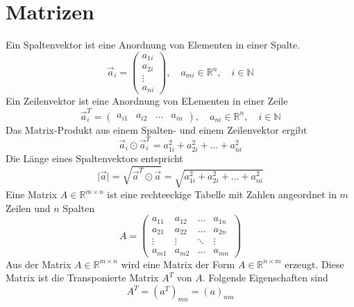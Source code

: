 \section{Matrizen}
Ein Spaltenvektor ist eine Anordnung von Elementen in einer Spalte.
\begin{equation}
\boxed{\overrightarrow{a}_i=\begin{pmatrix}a_{1i}\\a_{2i}\\\vdots\\a_{ni}\end{pmatrix},\quad a_{mi}\in \mathbb{R}^n, \quad i\in \mathbb{N}}
\end{equation}
Ein Zeilenvektor ist eine Anordnung von ELementen in einer Zeile
\begin{equation}
\boxed{\overrightarrow{a}_i^T=\begin{pmatrix}a_{i1}&a_{i2}&\dotso&a_{in}\end{pmatrix},\quad a_{ni}\in \mathbb{R}^n,\quad i\in\mathbb{N}}
\end{equation}
Das Matrix-Produkt aus einem Spalten- und einem Zeilenvektor ergibt 
\begin{equation}
\boxed{\overrightarrow{a}_i\odot \overrightarrow{a}_i^T=a_{1i}^2+a_{2i}^2+\dotso+a_{ni}^2}
\end{equation}
Die Länge eines Spaltenvektors entspricht
\begin{equation}
\boxed{\Big\vert\overrightarrow{a}\Big\vert=\sqrt{\overrightarrow{a}^T\odot \overrightarrow{a}}=\sqrt{a_{1i}^2+a_{2i}^2+\dotso+a_{ni}^2}}
\end{equation}
Eine Matrix $A\in\mathbb{R}^{m\times n}$ ist eine rechteeckige Tabelle mit Zahlen angeordnet in $m$ Zeilen und $n$ Spalten
\begin{equation}
\boxed{A=\begin{pmatrix}a_{11}&a_{12}&\dotso&a_{1n}\\a_{21}&a_{22}&\dotso&a_{2n}\\\vdots&\vdots&\ddots&\vdots\\a_{m1}&a_{m2}&\dotso&a_{mn}\end{pmatrix}}
\end{equation}
Aus der Matrix $A\in\mathbb{R}^{m\times n}$ wird eine Matrix der Form $A\in\mathbb{R}^{n\times m}$ erzeugt. Diese Matrix ist die Transponierte Matrix $A^T$ von $A$. Folgende Eigenschaften sind
\begin{equation}
\boxed{A^T=\left(a^T\right)_{mn}=\left(a\right)_{nm}}
\end{equation}
